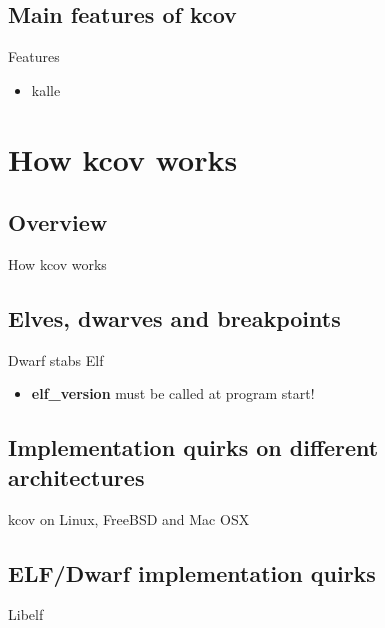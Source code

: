 \documentclass{beamer}
\begin{document}
\subsection{Main features of kcov}
\begin{frame}{Features}

  \begin{itemize}
    \item kalle
  \end{itemize}

\end{frame}

\section{How kcov works}
\subsection{Overview}
\begin{frame}{How kcov works}
  \note{}
\end{frame}

\subsection{Elves, dwarves and breakpoints}
\begin{frame}{Dwarf stabs Elf}
  \begin{itemize}
    \item \textbf{elf\_version} must be called at program start!
  \end{itemize}
\end{frame}

\subsection{Implementation quirks on different architectures}
\begin{frame}{kcov on Linux, FreeBSD and Mac OSX}
\end{frame}

\subsection{ELF/Dwarf implementation quirks}
\begin{frame}{Libelf}
\end{frame}
\end{document}
